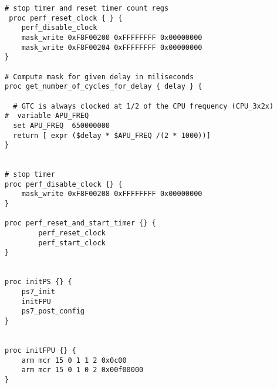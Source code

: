 \begin{lstlisting}
# stop timer and reset timer count regs 
 proc perf_reset_clock { } {
	perf_disable_clock
    mask_write 0xF8F00200 0xFFFFFFFF 0x00000000
    mask_write 0xF8F00204 0xFFFFFFFF 0x00000000
}

# Compute mask for given delay in miliseconds
proc get_number_of_cycles_for_delay { delay } {

  # GTC is always clocked at 1/2 of the CPU frequency (CPU_3x2x)
#  variable APU_FREQ
  set APU_FREQ  650000000
  return [ expr ($delay * $APU_FREQ /(2 * 1000))]
}


# stop timer 
proc perf_disable_clock {} {
    mask_write 0xF8F00208 0xFFFFFFFF 0x00000000 
}

proc perf_reset_and_start_timer {} {
  	    perf_reset_clock 
	    perf_start_clock 
}


proc initPS {} {
	ps7_init
    initFPU
	ps7_post_config
}


proc initFPU {} {
    arm mcr 15 0 1 1 2 0x0c00
    arm mcr 15 0 1 0 2 0x00f00000
}
\end{lstlisting}
























